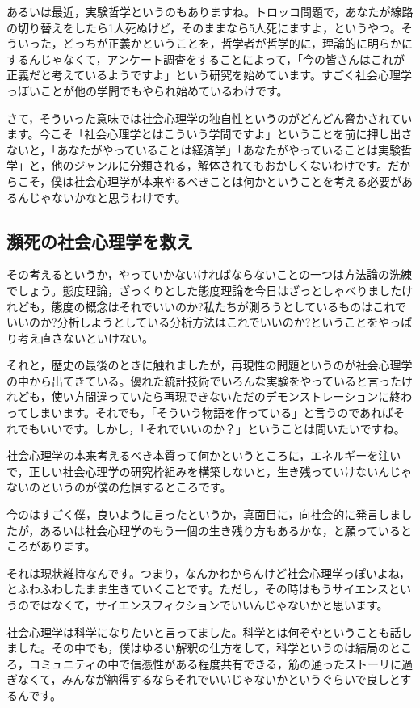 \documentclass{ltjsbook}
\begin{document}
あるいは最近，実験哲学というのもありますね。トロッコ問題で，あなたが線路の切り替えをしたら1人死ぬけど，そのままなら5人死にますよ，というやつ。そういった，どっちが正義かということを，哲学者が哲学的に，理論的に明らかにするんじゃなくて，アンケート調査をすることによって，「今の皆さんはこれが正義だと考えているようですよ」という研究を始めています。すごく社会心理学っぽいことが他の学問でもやられ始めているわけです。

さて，そういった意味では社会心理学の独自性というのがどんどん脅かされています。今こそ「社会心理学とはこういう学問ですよ」ということを前に押し出さないと，「あなたがやっていることは経済学」「あなたがやっていることは実験哲学」と，他のジャンルに分類される，解体されてもおかしくないわけです。だからこそ，僕は社会心理学が本来やるべきことは何かということを考える必要があるんじゃないかなと思うわけです。

\subsection{瀕死の社会心理学を救え}
その考えるというか，やっていかないければならないことの一つは方法論の洗練でしょう。態度理論，ざっくりとした態度理論を今日はざっとしゃべりましたけれども，態度の概念はそれでいいのか?私たちが測ろうとしているものはこれでいいのか?分析しようとしている分析方法はこれでいいのか?ということをやっぱり考え直さないといけない。

それと，歴史の最後のときに触れましたが，再現性の問題というのが社会心理学の中から出てきている。優れた統計技術でいろんな実験をやっていると言ったけれども，使い方間違っていたら再現できないただのデモンストレーションに終わってしまいます。それでも，「そういう物語を作っている」と言うのであればそれでもいいです。しかし，「それでいいのか？」ということは問いたいですね。

社会心理学の本来考えるべき本質って何かというところに，エネルギーを注いで，正しい社会心理学の研究枠組みを構築しないと，生き残っていけないんじゃないのというのが僕の危惧するところです。


今のはすごく僕，良いように言ったというか，真面目に，向社会的に発言しましたが，あるいは社会心理学のもう一個の生き残り方もあるかな，と願っているところがあります。

それは現状維持なんです。つまり，なんかわからんけど社会心理学っぽいよね，とふわふわしたまま生きていくことです。ただし，その時はもうサイエンスというのではなくて，サイエンスフィクションでいいんじゃないかと思います。

社会心理学は科学になりたいと言ってました。科学とは何ぞやということも話しました。その中でも，僕はゆるい解釈の仕方をして，科学というのは結局のところ，コミュニティの中で信憑性がある程度共有できる，筋の通ったストーリに過ぎなくて，みんなが納得するならそれでいいじゃないかというぐらいで良しとするんです。
\end{document}
